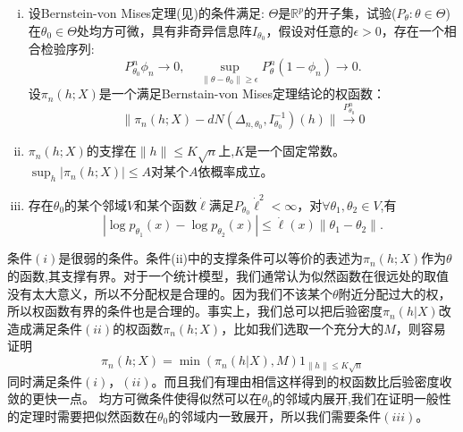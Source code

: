 \documentclass[review]{elsarticle}
\begin{document}
\begin{enumerate}[(i)]
    \item
        设Bernstein-von Mises定理(见\cite{van2000asymptotic})的条件满足: $\Theta$是$\mathbb{R}^p$的开子集，试验($P_{\theta}:\theta\in\Theta$)在$\theta_0\in \Theta$处均方可微，具有非奇异信息阵$I_{\theta_0}$，假设对任意的$\epsilon>0$，存在一个相合检验序列:
        \begin{equation}
            P_{\theta_0}^n\phi_n\to 0,\quad \sup_{\|\theta-\theta_0\|\geq \epsilon} P_\theta^n(1-\phi_n)\to 0.
        \end{equation}
        设$\pi_n(h;X)$是一个满足Bernstain-von Mises定理结论的权函数：
        \begin{equation}
            \|\pi_n(h;X)-dN(\Delta_{n,\theta_0},I_{\theta_0}^{-1})(h)\|\overset{P_{\theta_0}^n}{\to}0
        \end{equation}
    \item
        $\pi_n(h;X)$的支撑在$\|h\|\leq K\sqrt{n}$上,$K$是一个固定常数。$\sup_h |\pi_n(h;X)|\leq A$对某个$A$依概率成立。
    \item
        存在$\theta_0$的某个邻域$V$和某个函数$\dot{\ell}$满足$P_{\theta_0}\dot{\ell}^2<\infty$，对$\forall \theta_1,\theta_2\in V$,有
        \begin{equation}
            |\log p_{\theta_1}(x)-\log p_{\theta_2}(x)|\leq \dot{\ell}(x)\|\theta_1-\theta_2\|.
        \end{equation}
\end{enumerate}

条件$(i)$是很弱的条件。条件(ii)中的支撑条件可以等价的表述为$\pi_n(h;X)$作为$\theta$的函数,其支撑有界。对于一个统计模型，我们通常认为似然函数在很远处的取值没有太大意义，所以不分配权是合理的。因为我们不该某个$\theta$附近分配过大的权，所以权函数有界的条件也是合理的。事实上，我们总可以把后验密度$\pi_n(h|X)$改造成满足条件$(ii)$的权函数$\pi_n(h;X)$，比如我们选取一个充分大的$M$，则容易证明
\begin{equation}
    \pi_n(h;X)=\min(\pi_n(h|X),M) 1_{\|h\|\leq K\sqrt{n}}
\end{equation}
同时满足条件$(i)$，$(ii)$。而且我们有理由相信这样得到的权函数比后验密度收敛的更快一点。
均方可微条件使得似然可以在$\theta_0$的邻域内展开,我们在证明一般性的定理时需要把似然函数在$\theta_0$的邻域内一致展开，所以我们需要条件$(iii)$。
\end{document}
